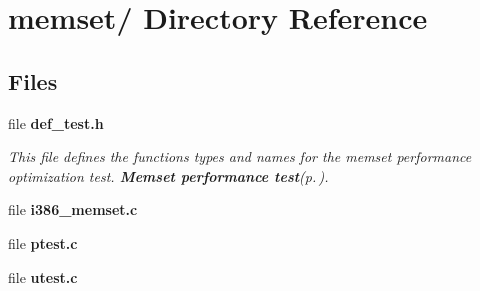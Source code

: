 \section{memset/ Directory Reference}
\label{dir_000004}
\subsection*{Files}
\begin{CompactItemize}
\item 
file {\bf def\_\-test.h}
\begin{CompactList}\small\item\em This file defines the functions types and names for the memset performance optimization test. {\bf Memset performance test}{\rm (p.\,\pageref{group__memset__test})}. \item\end{CompactList}

\item 
file {\bf i386_memset.c}
\item 
file {\bf ptest.c}
\item 
file {\bf utest.c}
\end{CompactItemize}
